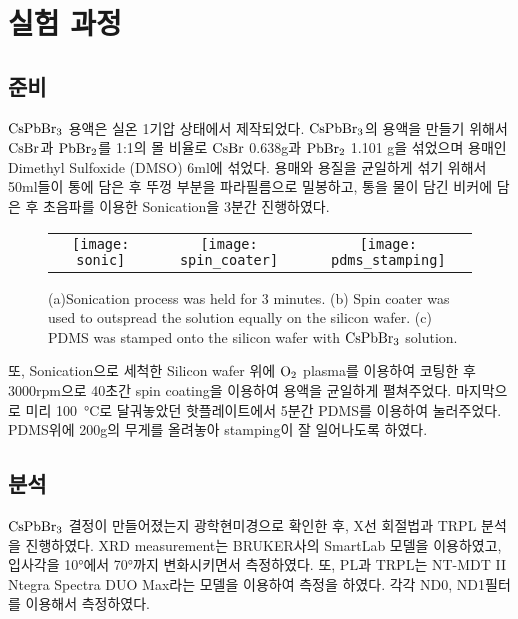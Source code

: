 \section{실험 과정}

\subsection{준비}
$\rm{CsPbBr_3}$ 용액은 실온 1기압 상태에서 제작되었다. $\rm{CsPbBr_3}$의 용액을 만들기 위해서 $\rm{CsBr}$과 $\rm{PbBr_2}$를 1:1의 몰 비율로 $\rm{CsBr}$ 0.638g과 $\rm{PbBr_2}$ 1.101 g을 섞었으며 용매인 Dimethyl Sulfoxide (DMSO) 6ml에 섞었다. 용매와 용질을 균일하게 섞기 위해서 50ml들이 통에 담은 후 뚜껑 부분을 파라필름으로 밀봉하고, 통을 물이 담긴 비커에 담은 후 초음파를 이용한 Sonication을 3분간 진행하였다. 

\begin{figure}[h]
	\begin{center}
		\begin{tabular}{ccc}
			\texttt{[image: sonic]} &   \texttt{[image: spin\_coater]} &
			\texttt{[image: pdms\_stamping]}
		\end{tabular}
		\caption{(a)Sonication process was held for 3 minutes. (b) Spin coater was used to outspread the solution equally on the silicon wafer. (c) PDMS was stamped onto the silicon wafer with $\rm{CsPbBr_3}$ solution. }	
		\label{fig:FIR221}
	\end{center}
\end{figure}
또, Sonication으로 세척한 Silicon wafer 위에 $\rm{O_2}$ plasma를 이용하여 코팅한 후 3000rpm으로 40초간 spin coating을 이용하여 용액을 균일하게 펼쳐주었다. 마지막으로 미리 \SI{100}{\celsius}로 달궈놓았던 핫플레이트에서 5분간 PDMS를 이용하여 눌러주었다. PDMS위에 200g의 무게를 올려놓아 stamping이 잘 일어나도록 하였다. \\

\subsection{분석}
$\rm{CsPbBr_3}$ 결정이 만들어졌는지 광학현미경으로 확인한 후, X선 회절법과 TRPL 분석을 진행하였다. XRD measurement는 BRUKER사의 SmartLab 모델을 이용하였고, 입사각을 10°에서 70°까지 변화시키면서 측정하였다. 또, PL과 TRPL는 NT-MDT II Ntegra Spectra DUO Max라는 모델을 이용하여 측정을 하였다. 각각 ND0, ND1필터를 이용해서 측정하였다.

